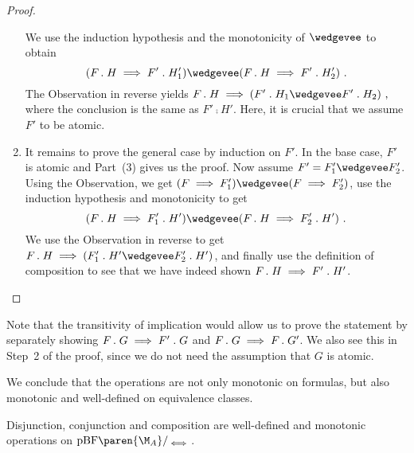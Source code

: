 \documentclass[../../diss.tex]{subfiles}
\begin{document}
\begin{proof}
\begin{enumerate}[(1)]
            We use the induction hypothesis and the monotonicity of $\wedgevee$ to obtain
            \[
                (F \comp H \lleq F' \comp H_1')
                \wedgevee
                (F \comp H \lleq F' \comp H_2')
                \ .
            \]
            The  Observation in reverse yields
            \(
               F \comp H \lleq (F' \comp H_1 \wedgevee F' \comp H_2)
               \ ,
            \)
            where the conclusion is the same as $F' \comp H'$.
            Here, it is crucial that we assume $F'$ to be atomic.
        \item
            It remains to prove the general case by induction on $F'$.
            In the base case, $F'$ is atomic and Part~(3) gives us the proof.
            Now assume $F' = F_1' \wedgevee F_2'$.
            Using the  Observation, we get $(F \lleq F_1') \wedgevee (F \lleq F_2')$, use the induction hypothesis and monotonicity to get
            \[
                (F \comp H \lleq F_1' \comp H')
                \wedgevee
                (F \comp H \lleq F_2' \comp H')
                \ .
            \]
            We use the  Observation in reverse to get $F \comp H \lleq (F_1' \comp H' \wedgevee F_2' \comp H')$, and finally use the definition of composition to see that we have indeed shown $F \mathrel{.} H \implies F' \mathrel{.} H'$.
     \end{enumerate}
     \vspace*{-\baselineskip}
\end{proof}

Note that the transitivity of implication would allow us to prove the statement by separately showing $F \mathrel{.} G \implies F' \mathrel{.} G$ and $F \mathrel{.}  G \implies F \mathrel{.} G'$.
We also see this in Step~2 of the proof, since we do not need the assumption that $G$ is atomic.

We conclude that the operations are not only monotonic on formulas, but also monotonic and well-defined on equivalence classes.

\begin{lemma}
    Disjunction, conjunction and composition are well-defined and monotonic operations on $\pBF\paren{\nfatransmonoid{A}}/_{\lequiv}$.
\end{lemma}
\end{document}
